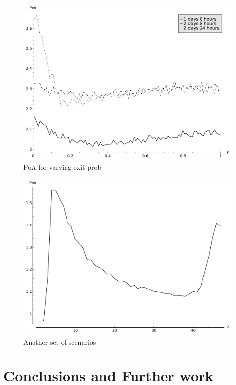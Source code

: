 \documentclass[12pt]{article}
\begin{document}
\begin{figure}[!hbtp]
    \begin{center}
        \includegraphics[width=.8\textwidth]{Images/AnaExit.pdf}
    \end{center}
    \caption{PoA for varying exit prob}\label{anaexit}
\end{figure}

\begin{figure}[!hbtp]
    \begin{center}
        \includegraphics[width=.8\textwidth]{Images/DualPeak.pdf}
    \end{center}
    \caption{Another set of scenarios}\label{dualpeak}
\end{figure}

\section{Conclusions and Further work}\label{conclusions}
\end{document}
